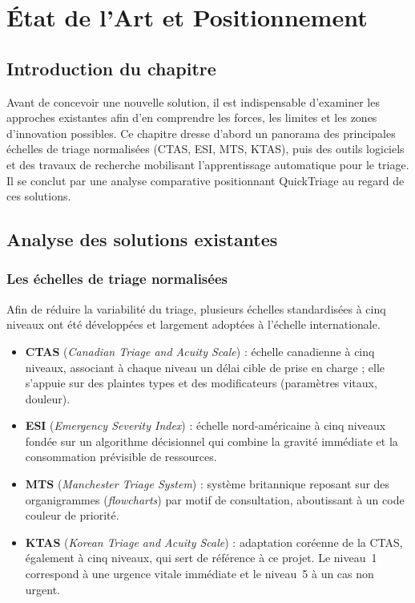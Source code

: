 \chapter{État de l'Art et Positionnement}

\section*{Introduction du chapitre}
Avant de concevoir une nouvelle solution, il est indispensable d'examiner les approches
existantes afin d'en comprendre les forces, les limites et les zones d'innovation possibles.
Ce chapitre dresse d'abord un panorama des principales échelles de triage normalisées
(CTAS, ESI, MTS, KTAS), puis des outils logiciels et des travaux de recherche mobilisant
l'apprentissage automatique pour le triage. Il se conclut par une analyse comparative
positionnant QuickTriage au regard de ces solutions.

\section{Analyse des solutions existantes}

\subsection{Les échelles de triage normalisées}
Afin de réduire la variabilité du triage, plusieurs échelles standardisées à cinq niveaux
ont été développées et largement adoptées à l'échelle internationale.

\begin{itemize}
  \item \textbf{CTAS} (\textit{Canadian Triage and Acuity Scale}) : échelle canadienne à
  cinq niveaux, associant à chaque niveau un délai cible de prise en charge ; elle s'appuie
  sur des plaintes types et des modificateurs (paramètres vitaux, douleur).
  \item \textbf{ESI} (\textit{Emergency Severity Index}) : échelle nord-américaine à cinq
  niveaux fondée sur un algorithme décisionnel qui combine la gravité immédiate et la
  consommation prévisible de ressources.
  \item \textbf{MTS} (\textit{Manchester Triage System}) : système britannique reposant sur
  des organigrammes (\textit{flowcharts}) par motif de consultation, aboutissant à un code
  couleur de priorité.
  \item \textbf{KTAS} (\textit{Korean Triage and Acuity Scale}) : adaptation coréenne de la
  CTAS, également à cinq niveaux, qui sert de référence à ce projet. Le niveau~1 correspond à
  une urgence vitale immédiate et le niveau~5 à un cas non urgent.
\end{itemize}

